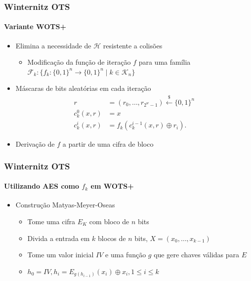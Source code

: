 \documentclass[12pt]{beamer}
\newcommand{\hh}{\mathcal{H}}
\newcommand{\binwds}[1]{\{0, 1\}^{#1}}
\begin{document}
\begin{frame}
  \frametitle{Winternitz OTS}
  \framesubtitle{Variante WOTS+}
  \begin{itemize}
    \item Elimina a necessidade de $\hh{}$ resistente a colisões
    \begin{itemize}
      \item Modificação da função de iteração $f$ para uma família
          $\mathcal{F}_k : \{f_k : \binwds{n} \longrightarrow \binwds{n} \mid k
            \in \mathcal{K}_n\}$
    \end{itemize}
    \item Máscaras de bits aleatórias em cada iteração
    \begin{align*}
      r &= (r_0, \dots, r_{2^w - 1}) \stackrel{\$}{\longleftarrow} \binwds{n} \\
      c^{0}_{k}(x, r) &= x \\
      c^{i}_{k}(x, r) &= f_k(c^{i-1}_{k}(x, r) \oplus r_i).
    \end{align*}
    \item Derivação de $f$ a partir de uma cifra de bloco
  \end{itemize}
\end{frame}

\begin{frame}
  \frametitle{Winternitz OTS}
  \framesubtitle{Utilizando AES como $f_k$ em WOTS+}
  \begin{itemize}
    \item Construção Matyas-Meyer-Oseas~\cite[Sec.
      9.41]{Menezes:1996:HAC:548089}
    \begin{itemize}
      \item Tome uma cifra $E_K$ com bloco de $n$ bits
      \item Divida a entrada em $k$ blocos de $n$ bits, $X = (x_0, \dots, x_{k
          - 1})$
      \item Tome um valor inicial $IV$ e uma função $g$ que gere chaves válidas
          para $E$
      \item $h_0 = IV, h_i = E_{g(h_{i-1})}(x_i) \oplus x_i, 1 \leq i \leq k$
    \end{itemize}
  \end{itemize}
  \begin{figure}[ht]
    \centering
  \end{figure}
\end{frame}
\end{document}
